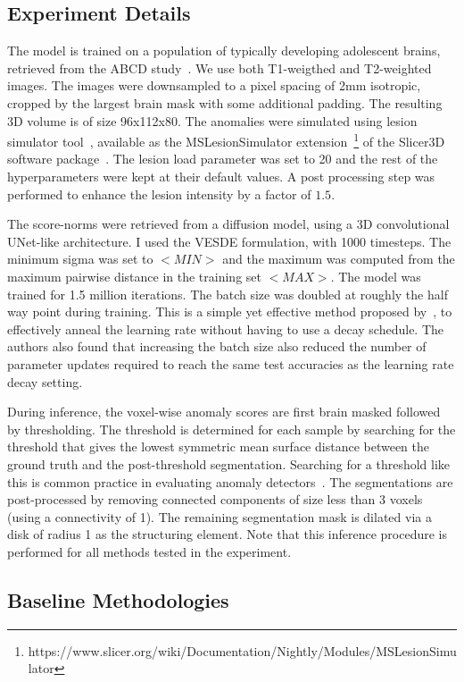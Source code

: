 \subsection*{Experiment Details}
The model is trained on a population of typically developing adolescent brains, retrieved from the ABCD study~\cite{Casey2018adolescent}. We use both T1-weigthed and T2-weighted images. The images were downsampled to a pixel spacing of 2mm isotropic, cropped by the largest brain mask with some additional padding. The resulting 3D volume is of size 96x112x80. The anomalies were simulated using lesion simulator tool~\cite{Filho_2019}, available as the MSLesionSimulator extension~\footnote{https://www.slicer.org/wiki/Documentation/Nightly/Modules/MSLesionSimulator} of the Slicer3D software package~\cite{fedorov3DSlicerImage2012}. The lesion load parameter was set to 20 and the rest of the hyperparameters were kept at their default values. A post processing step was performed to enhance the lesion intensity by a factor of $1.5$.

The score-norms were retrieved from a diffusion model, using a 3D convolutional UNet-like architecture. I used the VESDE formulation, with 1000 timesteps. The minimum sigma was set to $<MIN>$ and the maximum was computed from the maximum pairwise distance in the training set $<MAX>$. The model was trained for 1.5 million iterations. The batch size was doubled at roughly the half way point during training. This is a simple yet effective method proposed by~\cite{le2018dont}, to effectively anneal the learning rate without having to use a decay schedule. The authors also found that increasing the batch size also reduced the number of parameter updates required to reach the same test accuracies as the learning rate decay setting.

During inference, the voxel-wise anomaly scores are first brain masked followed by thresholding. The threshold is determined for each sample by searching for the threshold that gives the lowest symmetric mean surface distance between the ground truth and the post-threshold segmentation. Searching for a threshold like this is common practice in evaluating anomaly detectors~\cite{baur_deep_2019}. The segmentations are post-processed by removing connected components of size less than 3 voxels (using a connectivity of 1). The remaining segmentation mask is dilated via a disk of radius 1 as the structuring element. Note that this inference procedure is performed for all methods tested in the experiment.

\subsection*{Baseline Methodologies}

